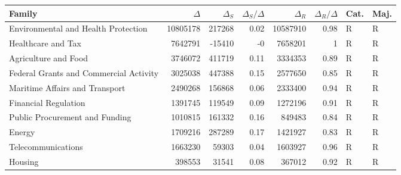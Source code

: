 \begin{tabular}{lrrrrrll}
\toprule
 Family                                 &   $\Delta$ &   $\Delta_S$ &   $\Delta_S/\Delta$ &   $\Delta_R$ &   $\Delta_R/\Delta$ & Cat.   & Maj.   \\
\midrule
 Environmental and Health Protection    &   10805178 &       217268 &                0.02 &     10587910 &                0.98 & R      & R      \\
 Healthcare and Tax                     &    7642791 &       -15410 &               -0    &      7658201 &                1    & R      & R      \\
 Agriculture and Food                   &    3746072 &       411719 &                0.11 &      3334353 &                0.89 & R      & R      \\
 Federal Grants and Commercial Activity &    3025038 &       447388 &                0.15 &      2577650 &                0.85 & R      & R      \\
 Maritime Affairs and Transport         &    2490268 &       156868 &                0.06 &      2333400 &                0.94 & R      & R      \\
 Financial Regulation                   &    1391745 &       119549 &                0.09 &      1272196 &                0.91 & R      & R      \\
 Public Procurement and Funding         &    1010815 &       161332 &                0.16 &       849483 &                0.84 & R      & R      \\
 Energy                                 &    1709216 &       287289 &                0.17 &      1421927 &                0.83 & R      & R      \\
 Telecommunications                     &    1663230 &        59303 &                0.04 &      1603927 &                0.96 & R      & R      \\
 Housing                                &     398553 &        31541 &                0.08 &       367012 &                0.92 & R      & R      \\
\bottomrule
\end{tabular}